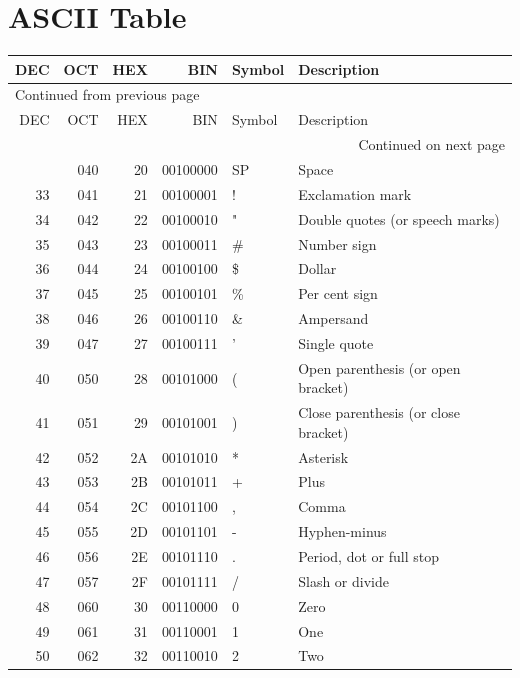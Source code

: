 \documentclass[11pt]{article}
\begin{document}
 \newpage

\section{ASCII Table}
\label{sec:orgccff5fa}

\begin{longtable}{rrrrll}
DEC & OCT & HEX & BIN & Symbol & Description\\[0pt]
\hline
\endfirsthead
\multicolumn{6}{l}{Continued from previous page} \\[0pt]
\hline

DEC & OCT & HEX & BIN & Symbol & Description \\[0pt]

\hline
\endhead
\hline\multicolumn{6}{r}{Continued on next page} \\
\endfoot
\endlastfoot
\hline
32 & 040 & 20 & 00100000 & SP & Space\\[0pt]
33 & 041 & 21 & 00100001 & ! & Exclamation mark\\[0pt]
34 & 042 & 22 & 00100010 & " & Double quotes (or speech marks)\\[0pt]
35 & 043 & 23 & 00100011 & \# & Number sign\\[0pt]
36 & 044 & 24 & 00100100 & \$ & Dollar\\[0pt]
37 & 045 & 25 & 00100101 & \% & Per cent sign\\[0pt]
38 & 046 & 26 & 00100110 & \& & Ampersand\\[0pt]
39 & 047 & 27 & 00100111 & ' & Single quote\\[0pt]
40 & 050 & 28 & 00101000 & ( & Open parenthesis (or open bracket)\\[0pt]
41 & 051 & 29 & 00101001 & ) & Close parenthesis (or close bracket)\\[0pt]
42 & 052 & 2A & 00101010 & * & Asterisk\\[0pt]
43 & 053 & 2B & 00101011 & + & Plus\\[0pt]
44 & 054 & 2C & 00101100 & , & Comma\\[0pt]
45 & 055 & 2D & 00101101 & - & Hyphen-minus\\[0pt]
46 & 056 & 2E & 00101110 & . & Period, dot or full stop\\[0pt]
47 & 057 & 2F & 00101111 & / & Slash or divide\\[0pt]
48 & 060 & 30 & 00110000 & 0 & Zero\\[0pt]
49 & 061 & 31 & 00110001 & 1 & One\\[0pt]
50 & 062 & 32 & 00110010 & 2 & Two\\[0pt]

\end{longtable}
\end{document}
